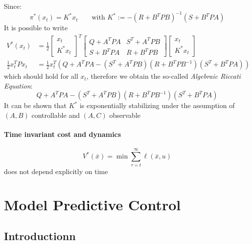 \documentclass[openany]{book}
\theoremstyle{definition}
\theoremstyle{remark}
\begin{document}
Since: 
\[
    \pi^*(x_t) = K^*x_t \qquad \text{with } K^* := -(R+B^TPB)^{-1}(S + B^TPA)
\]
It is possible to write 
\begin{align*}
    V^*(x_t) &= \frac{1}{2} \begin{bmatrix}
        x_t \\ K^* x_t
    \end{bmatrix}^T \begin{bmatrix}
        Q+A^T P A & S^T + A^T P B\\ 
        S + B^T P A & R + B^T P B
    \end{bmatrix} \begin{bmatrix}
        x_t \\ K^* x_t
    \end{bmatrix} \\
    \displaystyle\frac{1}{2}x_t^TPx_t&= \displaystyle\frac{1}{2}x_t^T\left(Q +A^TPA-(S^T+A^TPB)(R+B^TPB^{-1})(S^T+B^TPA)\right)
\end{align*}
which should hold for all $x_t$, therefore we obtain the so-called \emph{Algebraic Riccati Equation}:
\[
    Q +A^TPA-(S^T+A^TPB)(R+B^TPB^{-1})(S^T+B^TPA)
\]
It can be shown that $K^*$ is exponentially stabilizing under the assumption of $(A,B)$ controllable and $(A,C)$ observable

\subsubsection{Time invariant cost and dynamics} %

\[
    V^*(\bar{x})= \min \displaystyle\sum_{\tau=t}^{\infty}\ell(\bar{x},u)
\]
does not depend explicitly on time






















\chapter{Model Predictive Control}
\section{Introductionn}
\end{document}
